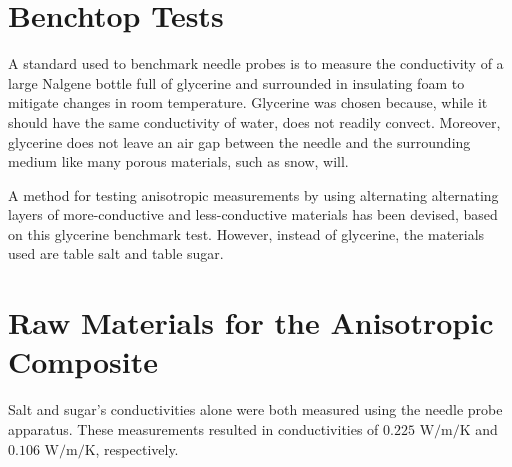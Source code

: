 \section{Benchtop Tests}

A standard used to benchmark needle probes is to measure the conductivity of a
large Nalgene bottle full of glycerine and surrounded in insulating foam to
mitigate changes in room temperature. Glycerine was chosen because, while it
should have the same conductivity of water, does not readily convect. Moreover,
glycerine does not leave an air gap between the needle and the surrounding
medium like many porous materials, such as snow, will.

A method for testing anisotropic measurements by using alternating alternating
layers of more-conductive and less-conductive materials has been devised, based on
this glycerine benchmark test. However, instead of glycerine, the materials
used are table salt and table sugar.

\section{Raw Materials for the Anisotropic Composite}

Salt and sugar's conductivities alone were both measured using the needle probe
apparatus. These measurements resulted in conductivities of
\(0.225\) \(\textrm{W}/\textrm{m}/\textrm{K}\) and 
\(0.106\) \(\textrm{W}/\textrm{m}/\textrm{K}\), respectively.


